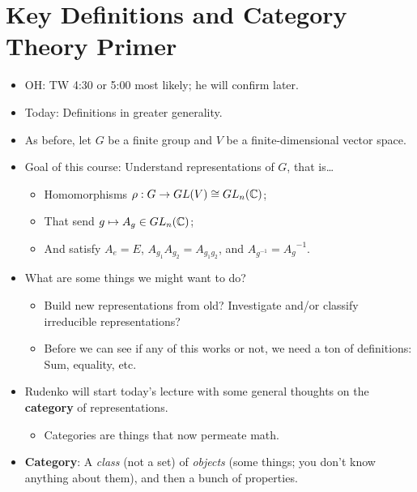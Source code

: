 \documentclass[../notes.tex]{subfiles}
\begin{document}
\section{Key Definitions and Category Theory Primer}
\begin{itemize}
    \item {}OH: TW 4:30 or 5:00 most likely; he will confirm later.
    \item Today: Definitions in greater generality.
    \item As before, let $G$ be a finite group and $V$ be a finite-dimensional vector space.
    \item Goal of this course: Understand representations of $G$, that is\dots
    \begin{itemize}
        \item Homomorphisms $\rho:G\to GL(V)\cong GL_n(\mathbb{C})$;
        \item That send $g\mapsto A_g\in GL_n(\mathbb{C})$;
        \item And satisfy $A_e=E$, $A_{g_1}A_{g_2}=A_{g_1g_2}$, and $A_{g^{-1}}={A_g}^{-1}$.
    \end{itemize}
    \item What are some things we might want to do?
    \begin{itemize}
        \item Build new representations from old? Investigate and/or classify irreducible representations?
        \item Before we can see if any of this works or not, we need a ton of definitions: Sum, equality, etc.
    \end{itemize}
    \item Rudenko will start today's lecture with some general thoughts on the \textbf{category} of representations.
    \begin{itemize}
        \item Categories are things that now permeate math.
    \end{itemize}
    \item \textbf{Category}: A \emph{class} (not a set) of \emph{objects} (some things; you don't know anything about them), and then a bunch of properties.
    \begin{figure}[h!]
        \centering
\end{figure}
\end{itemize}
\end{document}
